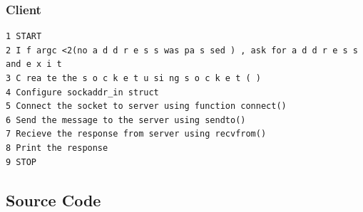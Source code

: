 \subsubsection{Client}
\begin{verbatim}
1 START
2 I f argc <2(no a d d r e s s was pa s sed ) , ask for a d d r e s s and e x i t
3 C rea te the s o c k e t u si ng s o c k e t ( )
4 Configure sockaddr_in struct
5 Connect the socket to server using function connect()
6 Send the message to the server using sendto()
7 Recieve the response from server using recvfrom()
8 Print the response
9 STOP
\end{verbatim}

\subsection{Source Code}

